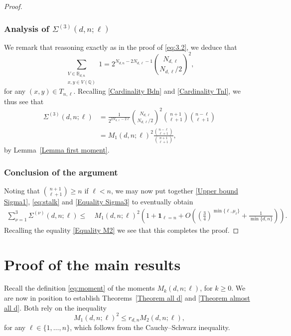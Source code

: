 \documentclass[11pt, reqno]{amsart}
\numberwithin{equation}{section}
\renewcommand{\leq}{\leqslant}
\renewcommand{\geq}{\geqslant}
\begin{document}
\begin{proof}
\subsubsection*{Analysis of $\Sigma^{(3)}(d,n;\ell)$}

We remark that reasoning exactly as in the proof of  \eqref{eq:3.2}, we deduce that 
\begin{equation*}
\sum_{\substack{V \in \mathbb{B}_{d,n} \\ x, y \in V(\mathbb{Q})}} 1 = 2^{N_{d,n}-2N_{d,\ell}-1} \binom{N_{d,\ell}}{N_{d,\ell}/2}^2,
\end{equation*}
for any  $(x, y) \in T_{n,\ell}$.
Recalling  \eqref{Cardinality Bdn} and \eqref{Cardinality Tnl}, we thus see that
\begin{equation}
\label{Equality Sigma3}
\begin{split}
\Sigma^{(3)}(d,n;\ell) 
&= \frac1{2^{2N_{d,\ell}-2\ell}} \binom{N_{d,\ell}}{N_{d,\ell}/2}^2 \binom{n+1}{\ell+1} \binom{n-\ell}{\ell+1}\\
&= M_1(d,n;\ell)^2  \frac{\binom{n-\ell}{\ell+1}}{\binom{n+1}{\ell+1}},
\end{split}
\end{equation}
by Lemma~\ref{Lemma first moment}.

\subsubsection*{Conclusion of the argument}

Noting that 
$\binom{n+1}{\ell+1} \geq n$ 
if $\ell < n$, we may now put together \eqref{Upper bound Sigma1}, \eqref{eq:stalk} and \eqref{Equality Sigma3} to eventually obtain
\begin{align*}
\sum_{\nu = 1}^3 \Sigma^{(\nu)}(d,n;\ell) \leq~& M_1(d,n;\ell)^2
\left(1+ \boldsymbol{1}_{\ell=n}
+O\left(\left(\frac{3}{4}\right)^{\min\{\ell,\mu_\ell\}} +\frac{1}{\min\{d,n\}}
\right)\right).
\end{align*}
Recalling the equality \eqref{Equality M2} we see that this completes the proof. 
\end{proof}

\section{Proof of the main results}\label{s:proofs}

Recall the definition \eqref{eq:moment} of the moments $M_k(d,n;\ell)$, for $k\geq 0$.
We are now in position to establish Theorems~\ref{Theorem all d}
and \ref{Theorem almost all d}. Both rely on the inequality
\begin{equation}
\label{Inequality CS}
M_1(d,n;\ell)^2 \leq r_{d,n} M_2(d,n;\ell),
\end{equation}
 for any $\ell \in \{1, \dots, n \}$,
which follows from the Cauchy--Schwarz inequality.
\end{document}
